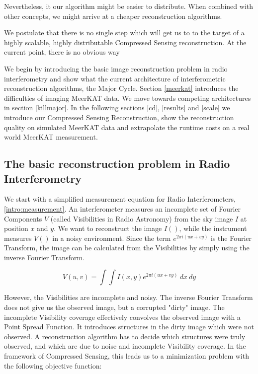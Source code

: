 Nevertheless, it our algorithm might be easier to distribute. When combined with other concepts, we might arrive at a cheaper reconstruction algorithms.

We postulate that there is no single step which will get us to to the target of a highly scalable, highly distributable Compressed Sensing reconstruction. At the current point, there is no obvious way

We begin by introducing the basic image reconstruction problem in radio interferometry and show what the current architecture of interferometric reconstruction algorithms, the Major Cycle. Section \ref{meerkat} introduces the difficulties of imaging MeerKAT data. We  move towards competing architectures in section \ref{killmajor}. In the following sections \ref{cd}, \ref{results} and \ref{scale} we introduce our Compressed Sensing Reconstruction, show the reconstruction quality on simulated MeerKAT data and extrapolate the runtime costs on a real world MeerKAT measurement.

\subsection{The basic reconstruction problem in Radio Interferometry}\label{intro:basic}
We start with a simplified measurement equation for Radio Interferometers, \eqref{intro:measurement}. An interferometer measures an incomplete set of Fourier Components $V$ (called Visibilities in Radio Astronomy) from the sky image $I$ at position $x$ and $y$. We want to reconstruct the image $I()$, while the instrument measures $V()$ in a noisy environment. Since the term $e^{2 \pi i (ux+vy)}$ is the Fourier Transform, the image can be calculated from the Visibilities by simply using the inverse Fourier Transform.

\begin{equation}\label{intro:measurement}
V(u, v) = \int\int I(x, y) e^{2 \pi i (ux+vy)} \: dx \: dy
\end{equation}

However, the Visibilities are incomplete and noisy. The inverse Fourier Transform does not give us the observed image, but a corrupted "dirty" image. The incomplete Visibility coverage effectively convolves the observed image with a Point Spread Function. It introduces structures in the dirty image which were not observed. A reconstruction algorithm has to decide which structures were truly observed, and which are due to noise and incomplete Visibility coverage. In the framework of Compressed Sensing, this leads us to a minimization problem with the following objective function:

